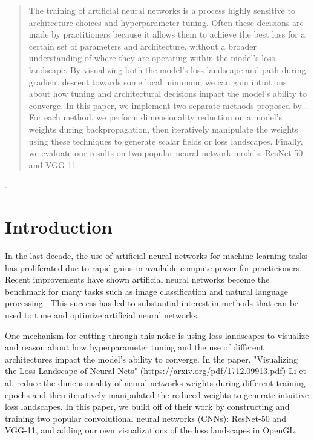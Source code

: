 \documentclass{acmsiggraph}
\begin{document}
\begin{abstract}

	\copyrightspace
    The training of artificial neural networks is a process highly sensitive to architecture choices and hyperparameter tuning. Often these decisions are made by practitioners because it allows them to achieve the best loss for a certain set of parameters and architecture, without a broader understanding of where they are operating within the model's loss landscape. By visualizing both the model's loss landscape and path during gradient descent towards some local minimum, we can gain intuitions about how tuning and architectural decisions impact the model's ability to converge. In this paper, we implement two separate methods proposed by \cite{NEURIPS2018_a41b3bb3}. For each method, we perform dimensionality reduction on a model's weights during backpropagation, then iteratively manipulate the weights using these techniques to generate scalar fields or loss landscapes. Finally, we evaluate our results on two popular neural network models: ResNet-50 and VGG-11.
	
\end{abstract}

\keywordlist.

\section{Introduction}
\label{sec:intro}

In the last decade, the use of artificial neural networks for machine learning tasks has proliferated due to rapid gains in available compute power for practicioners. Recent improvements have shown artificial neural networks become the benchmark for many tasks such as image classification and natural language processing \cite{ABIODUN2018e00938}. This success has led to substantial interest in methods that can be used to tune and optimize artificial neural networks. 

One mechanism for cutting through this noise is using loss landscapes to visualize and reason about how hyperparameter tuning and the use of different architectures impact the model's ability to converge. In the paper, "Visualizing the Loss Landscape of Neural Nets" (\url{https://arxiv.org/pdf/1712.09913.pdf}) Li et al. reduce the dimensionality of neural networks weights during different training epochs and then iteratively manipulated the reduced weights to generate intuitive loss landscapes. In this paper, we build off of their work by constructing and training two popular convolutional neural networks (CNNs): ResNet-50 and VGG-11, and adding our own visualizations of the loss landscapes in OpenGL.
\end{document}
